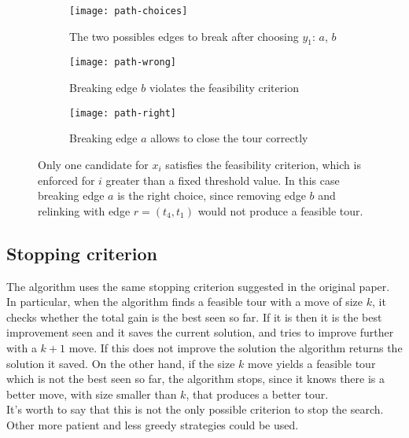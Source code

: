 \begin{figure}[h]
	\centering
	\begin{subfigure}[c]{0.31\textwidth}
		\texttt{[image: path-choices]}
		\caption{The two possibles edges to break after choosing $y_1$: $a$, $b$}
	\end{subfigure}
	\begin{subfigure}[c]{0.31\textwidth}
		\texttt{[image: path-wrong]}
		\caption{Breaking edge $b$ violates the feasibility criterion}
	\end{subfigure}
	\begin{subfigure}[c]{0.31\textwidth}
		\texttt{[image: path-right]}
		\caption{Breaking edge $a$ allows to close the tour correctly}
	\end{subfigure}
	\caption{Only one candidate for $x_i$ satisfies the feasibility criterion, which is enforced for $i$ greater than a fixed threshold value. In this case breaking edge $a$ is the right choice, since removing edge $b$ and relinking with edge $r=(t_4,t_1)$ would not produce a feasible tour.}
	\label{fig:feasibility-moves}
\end{figure}

\subsection{Stopping criterion}
The algorithm uses the same stopping criterion suggested in the original paper. In particular, when the algorithm finds a feasible tour with a move of size $k$, it checks whether the total gain is the best seen so far. If it is then it is the best improvement seen and it saves the current solution, and tries to improve further with a $k+1$ move. If this does not improve the solution the algorithm returns the solution it saved. On the other hand, if the size $k$ move yields a feasible tour which is not the best seen so far, the algorithm stops, since it knows there is a better move, with size smaller than $k$, that produces a better tour.\\
It's worth to say that this is not the only possible criterion to stop the search. Other more patient and less greedy strategies could be used.

